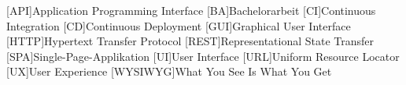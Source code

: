 %

\begin{acronym}[WYSIWYG]  %
  [API]{Application Programming Interface}
  [BA]{Bachelorarbeit}
  [CI]{Continuous Integration}
  [CD]{Continuous Deployment}
  [GUI]{Graphical User Interface}
  [HTTP]{Hypertext Transfer Protocol}
  [REST]{Representational State Transfer}
  [SPA]{Single-Page-Applikation}
  [UI]{User Interface}
  [URL]{Uniform Resource Locator}
  [UX]{User Experience}
  [WYSIWYG]{What You See Is What You Get}
\end{acronym}
